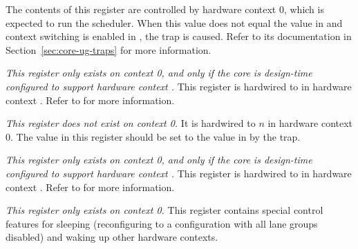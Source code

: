 The contents of this register are controlled by hardware context 0, which is 
expected to run the scheduler. When this value does not equal the value in 
 and context switching is enabled in , the 
 trap is caused. Refer to its documentation in
Section~\ref{sec:core-ug-traps} for more information.



\emph{This register only exists on context 0, and only if the core is
design-time configured to support hardware context \n{}.} This register is 
hardwired to  in hardware context \n{}. Refer to  for more
information.

\coreCanWrite{}
\debugCanWrite{}


\emph{This register does not exist on context 0.} It is hardwired to
$n$ in hardware context 0. The value in this register should be set
to the value in  by the  trap.

\coreCanWrite{}
\debugCanWrite{}


\emph{This register only exists on context 0, and only if the core is
design-time configured to support hardware context \n{}.} This register is 
hardwired to  in hardware context \n{}. Refer to  for more
information.



\emph{This register only exists on context 0.} This register contains special 
control features for sleeping (reconfiguring to a configuration with all lane 
groups disabled) and waking up other hardware contexts.

